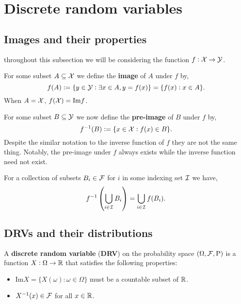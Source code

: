 \section{Discrete random variables}

\subsection{Images and their properties}
throughout this subsection we will be considering the function $f:\mathcal{X} \rightarrow \mathcal{Y}$.
\begin{definition}[Image]
    For some subset $A \subseteq \mathcal{X}$ we define the \textbf{image} of $A$ under $f$ by, \[
        f(A) := \{y \in \mathcal{Y}: \exists x \in A, y = f(x)\} = \{f(x): x \in A\} \textcolor{black}{.}
    \]
When $A = \mathcal{X}$, $f(\mathcal{X}) = \text{Im}f$.
\end{definition}

\begin{definition}
    For some subset $B \subseteq \mathcal{Y}$ we now define the \textbf{pre-image} of $B$ under $f$ by, \[
    f^{-1}(B) := \{x\in\mathcal{X}: f(x) \in B\} \textcolor{black}{.}
    \]
Despite the similar notation to the inverse function of $f$ they are not the same thing. Notably, the pre-image under $f$ always exists while the inverse function need not exist.
\end{definition}

\begingroup\belowdisplayskip=-10pt
\begin{lemma}
    For a collection of subsets $B_i \in \mathcal{F}$ for $i$ in some indexing set $\mathcal{I}$ we have, \[
        f^{-1}\left(\bigcup_{i\in\mathcal{I}} B_i \right) = \bigcup_{i\in\mathcal{I}} f(B_i) \textcolor{black}{.}
    \]
\end{lemma}
\endgroup

\subsection{DRVs and their distributions}

\begin{definition}
    A \textbf{discrete random variable} (\textbf{DRV}) on the probability space $(\Omega, \mathcal{F}, \mathrm{P})$ is a function $X: \Omega \rightarrow \mathbb{R}$ that satisfies the following properties:
    \begin{itemize}
        \item $\text{Im}X = \{X(\omega): \omega \in \Omega\}$ must be a countable subset of $\mathbb{R}$.
        \item $X^{-1}(x) \in \mathcal{F}$ for all $x \in \mathbb{R}$.
    \end{itemize}
\end{definition}

